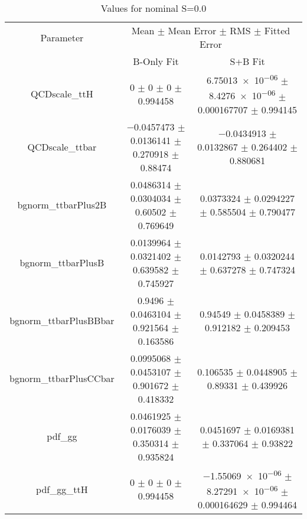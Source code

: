 \begin{table}
\centering
\caption{Values for nominal S=0.0}
\begin{tabular}{ccc}
\toprule
Parameter & \multicolumn{2}{c}{Mean $\pm$ Mean Error $\pm$ RMS $\pm$ Fitted Error}\\
 & B-Only Fit & S+B Fit\\
\midrule
QCDscale\_ttH & \num{0} $\pm$ \num{0} $\pm$ \num{0} $\pm$ \num{0.994458} & \num{6.75013e-06} $\pm$ \num{8.4276e-06} $\pm$ \num{0.000167707} $\pm$ \num{0.994145}\\
QCDscale\_ttbar & \num{-0.0457473} $\pm$ \num{0.0136141} $\pm$ \num{0.270918} $\pm$ \num{0.88474} & \num{-0.0434913} $\pm$ \num{0.0132867} $\pm$ \num{0.264402} $\pm$ \num{0.880681}\\
bgnorm\_ttbarPlus2B & \num{0.0486314} $\pm$ \num{0.0304034} $\pm$ \num{0.60502} $\pm$ \num{0.769649} & \num{0.0373324} $\pm$ \num{0.0294227} $\pm$ \num{0.585504} $\pm$ \num{0.790477}\\
bgnorm\_ttbarPlusB & \num{0.0139964} $\pm$ \num{0.0321402} $\pm$ \num{0.639582} $\pm$ \num{0.745927} & \num{0.0142793} $\pm$ \num{0.0320244} $\pm$ \num{0.637278} $\pm$ \num{0.747324}\\
bgnorm\_ttbarPlusBBbar & \num{0.9496} $\pm$ \num{0.0463104} $\pm$ \num{0.921564} $\pm$ \num{0.163586} & \num{0.94549} $\pm$ \num{0.0458389} $\pm$ \num{0.912182} $\pm$ \num{0.209453}\\
bgnorm\_ttbarPlusCCbar & \num{0.0995068} $\pm$ \num{0.0453107} $\pm$ \num{0.901672} $\pm$ \num{0.418332} & \num{0.106535} $\pm$ \num{0.0448905} $\pm$ \num{0.89331} $\pm$ \num{0.439926}\\
pdf\_gg & \num{0.0461925} $\pm$ \num{0.0176039} $\pm$ \num{0.350314} $\pm$ \num{0.935824} & \num{0.0451697} $\pm$ \num{0.0169381} $\pm$ \num{0.337064} $\pm$ \num{0.93822}\\
pdf\_gg\_ttH & \num{0} $\pm$ \num{0} $\pm$ \num{0} $\pm$ \num{0.994458} & \num{-1.55069e-06} $\pm$ \num{8.27291e-06} $\pm$ \num{0.000164629} $\pm$ \num{0.994464}\\
\bottomrule
\end{tabular}
\end{table}